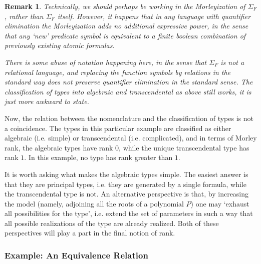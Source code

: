 \documentclass{article}
\newtheorem{remark}[theorem]{Remark}
\theoremstyle{nonumberplain}
\begin{document}
\begin{remark}\label{rmk:qem}
Technically, we should perhaps be working in the Morleyization of $\Sigma_F$, rather than $\Sigma_F$ itself. However, it happens that in any language with quantifier elimination the Morleyization adds no additional expressive power, in the sense that any `new' predicate symbol is equivalent to a finite boolean combination of previously existing atomic formulas.

There is some abuse of notation happening here, in the sense that $\Sigma_F$ is not a relational language, and replacing the function symbols by relations in the standard way does not preserve quantifier elimination in the standard sense. The classification of types into algebraic and transcendental as above still works, it is just more awkward to state.
\end{remark}

Now, the relation between the nomenclature and the classification of types is not a coincidence. The types in this particular example are classified as either algebraic (i.e. simple) or transcendental (i.e. complicated), and in terms of Morley rank, the algebraic types have rank $0$, while the unique transcendental type has rank $1$. In this example, no type has rank greater than $1$.

It is worth asking what makes the algebraic types simple. The easiest answer is that they are principal types, i.e. they are generated by a single formula, while the transcendental type is not. An alternative perspective is that, by increasing the model (namely, adjoining all the roots of a polynomial $P$) one may `exhaust all possibilities for the type', i.e. extend the set of parameters in such a way that all possible realizations of the type are already realized. Both of these perspectives will play a part in the final notion of rank.

\subsubsection{Example: An Equivalence Relation}
\end{document}
